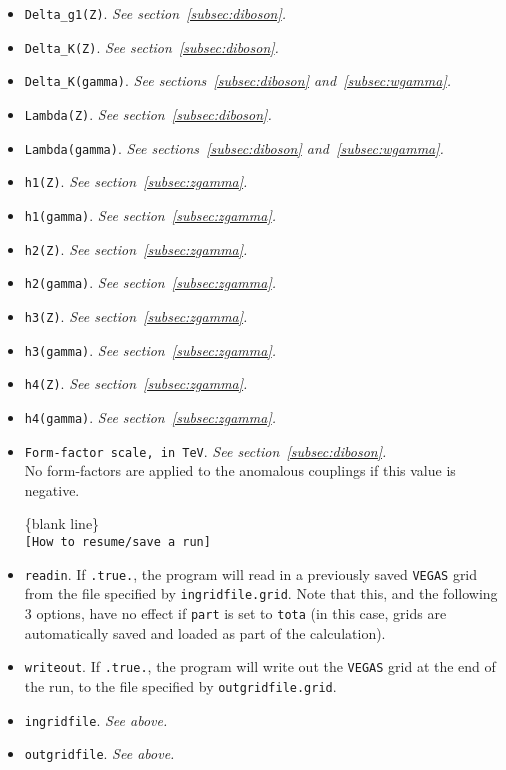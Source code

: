 \documentclass[12pt]{article}
\begin{document}
\begin{itemize}
\item {\tt Delta\_g1(Z)}. {\it See section~\ref{subsec:diboson}.}
\item {\tt Delta\_K(Z)}. {\it See section~\ref{subsec:diboson}.}
\item {\tt Delta\_K(gamma)}. {\it See sections~\ref{subsec:diboson} and~\ref{subsec:wgamma}.}
\item {\tt Lambda(Z)}. {\it See section~\ref{subsec:diboson}.}
\item {\tt Lambda(gamma)}. {\it See sections~\ref{subsec:diboson} and~\ref{subsec:wgamma}.}
\item {\tt h1(Z)}. {\it See section~\ref{subsec:zgamma}.}
\item {\tt h1(gamma)}. {\it See section~\ref{subsec:zgamma}.}
\item {\tt h2(Z)}. {\it See section~\ref{subsec:zgamma}.}
\item {\tt h2(gamma)}. {\it See section~\ref{subsec:zgamma}.}
\item {\tt h3(Z)}. {\it See section~\ref{subsec:zgamma}.}
\item {\tt h3(gamma)}. {\it See section~\ref{subsec:zgamma}.}
\item {\tt h4(Z)}. {\it See section~\ref{subsec:zgamma}.}
\item {\tt h4(gamma)}. {\it See section~\ref{subsec:zgamma}.}
\item {\tt Form-factor scale, in TeV}. {\it See section~\ref{subsec:diboson}.} \\
No form-factors are applied to the anomalous couplings if this value is negative.

\begin{center}
\{blank line\} \\
{\tt [How to resume/save a run] }
\end{center}

\item {\tt readin}. If {\tt .true.}, the program will read in a
previously saved {\tt VEGAS} grid from the file specified by
{\tt ingridfile.grid}. Note that this, and the following 3 options,
have no effect if {\tt part} is set to {\tt tota} (in this case, grids
are automatically saved and loaded as part of the calculation).

\item {\tt writeout}. If {\tt .true.}, the program will write out
the {\tt VEGAS} grid at the end of the run, to the file specified by
{\tt outgridfile.grid}.

\item {\tt ingridfile}.  {\it See above.}

\item {\tt outgridfile}.  {\it See above.}

\end{itemize}
\end{document}
